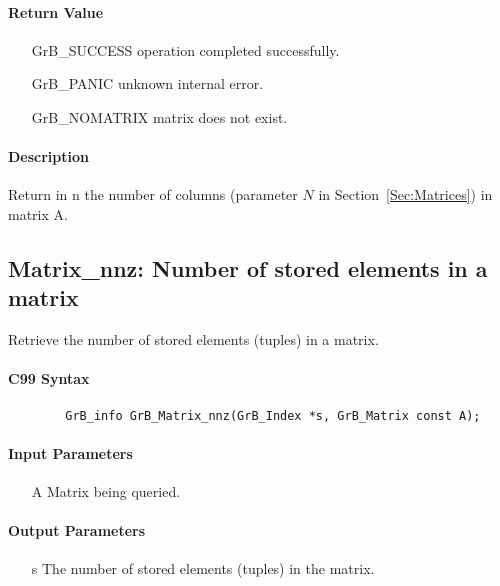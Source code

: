 \paragraph{Return Value}

\begin{itemize}[leftmargin=2.1in]
\item[{\sf GrB\_SUCCESS}]   operation completed successfully.
\item[{\sf GrB\_PANIC}]     unknown internal error.
\item[{\sf GrB\_NOMATRIX}]  matrix does not exist.
\end{itemize}

\paragraph{Description}

Return in {\sf n} the number of columns (parameter $N$ in Section~\ref{Sec:Matrices}) in matrix {\sf A}.

\subsection{{\sf Matrix\_nnz}: Number of stored elements in a matrix}

Retrieve the number of stored elements (tuples) in a matrix.

\paragraph{C99 Syntax}

\begin{verbatim}
        GrB_info GrB_Matrix_nnz(GrB_Index *s, GrB_Matrix const A);
\end{verbatim}

\paragraph{Input Parameters}

\begin{itemize}[leftmargin=1.1in]
    \item[{\sf A}] Matrix being queried.
\end{itemize}

\paragraph{Output Parameters}
\begin{itemize}[leftmargin=1.1in]
    \item[{\sf s}] The number of stored elements (tuples) in the matrix.
\end{itemize}

